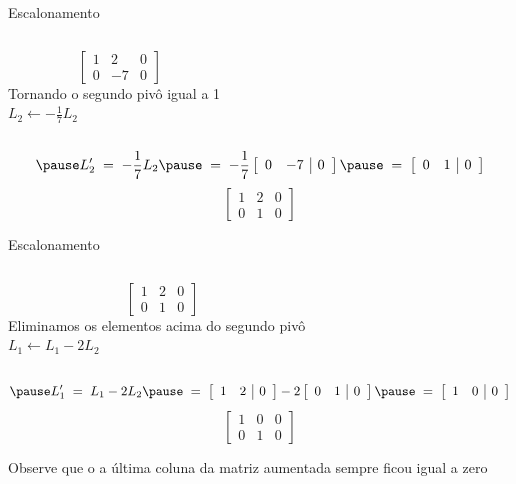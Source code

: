 \begin{resolution}{Escalonamento}
  \begin{columns}
    \[\;\;\;
    \left[\begin{array}{cc|c}
      1 & 2  & 0 \\
      0 & -7 & 0
    \end{array}\right]
    \]
    \pause
    Tornando o segundo pivô igual a 1
    \\ \pause
    \(
      L_2 \leftarrow - \frac{1}{7} L_2
    \)
  \end{columns}
  \vspace{-\baselineskip}
  \[
    \pause
    L'_2
    \;=\;
    - \frac{1}{7} L_2
    \pause
    \;=\;
    - \frac{1}{7}
    \left[\begin{array}{cc|c}
      0 & -7 & 0
    \end{array}\right]
    \pause
    \;=\;
    \left[\begin{array}{cc|c}
      0 & 1 & 0
    \end{array}\right]
  \]
  \pause
  \[
    \left[\begin{array}{cc|c}
      1 & 2 & 0 \\
      0 & 1 & 0
    \end{array}\right]
  \]
\end{resolution}

\begin{resolution}{Escalonamento}
  \begin{columns}
    \[\;\;\;
    \left[\begin{array}{cc|c}
      1 & 2 & 0 \\
      0 & 1 & 0
    \end{array}\right]
    \]
    \pause
    Eliminamos os elementos acima do segundo pivô
    \\ \pause
    \(
      L_1 \leftarrow L_1 - 2 L_2
    \)
  \end{columns}
  \vspace{-\baselineskip}
  \[
    \pause
    L'_1
    \;=\;
    L_1 - 2 L_2
    \pause
    \;=\;
    \left[\begin{array}{cc|c}
      1 & 2 & 0
    \end{array}\right]
    - 2
    \left[\begin{array}{cc|c}
      0 & 1 & 0
    \end{array}\right]
    \pause
    \;=\;
    \left[\begin{array}{cc|c}
      1 & 0 & 0
    \end{array}\right]
  \]
  \pause
  \[
    \left[\begin{array}{cc|c}
      1 & 0 & 0 \\
      0 & 1 & 0
    \end{array}\right]
  \]

  \pause
  \bigskip
  Observe que o a última coluna da matriz aumentada sempre ficou igual a zero
\end{resolution}

